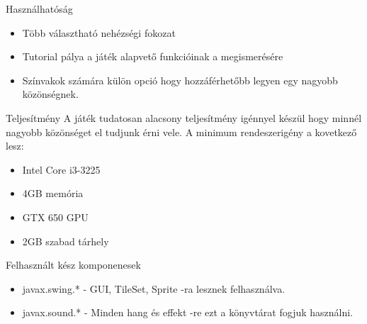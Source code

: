 \documentclass[14pt, aspectratio=169]{beamer}
\begin{document}
	\begin{frame}{Használhatóság}
		\begin{itemize}
			\item Több választható nehézségi fokozat
			\item Tutorial pálya a játék alapvető funkcióinak a megismerésére
			\item Színvakok számára külön opció hogy hozzáférhetőbb legyen egy nagyobb közönségnek.
		\end{itemize}
	\end{frame}
	
	\begin{frame}{Teljesítmény}
		A játék tudatosan alacsony teljesítmény igénnyel készül hogy minnél nagyobb közönséget el tudjunk érni vele. A minimum rendeszerigény a kovetkező lesz:
		\begin{itemize}
			\item Intel Core i3-3225 
			\item 4GB memória
			\item GTX 650 GPU
			\item 2GB szabad tárhely
		\end{itemize}
	\end{frame}
	
	\begin{frame}{Felhasznált kész komponenesek}
		\begin{itemize}
			\item javax.swing.* - GUI, TileSet, Sprite -ra lesznek felhasználva.
			\item javax.sound.* - Minden hang és effekt -re ezt a könyvtárat fogjuk használni.
		\end{itemize}
	\end{frame}
\end{document}
